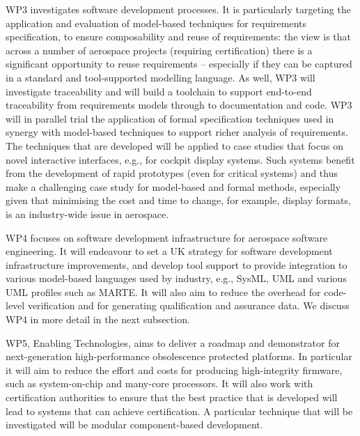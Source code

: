 WP3 investigates software development processes. It is particularly targeting the application and evaluation of model-based techniques for requirements
specification, to ensure composability and reuse of requirements: the view is that across a number of aerospace projects (requiring certification) there is a significant opportunity to reuse requirements -- especially if they can be captured in a standard and tool-supported modelling language. As well, WP3 will investigate traceability and will build a toolchain to support end-to-end
traceability from requirements models through to documentation and code. WP3 will in parallel trial the application of formal specification techniques used in
synergy with model-based techniques to support richer analysis of requirements. The techniques that are developed will be applied to case studies that
focus on novel interactive interfaces, e.g., for cockpit display systems. Such systems benefit from the development of rapid prototypes (even for critical
systems) and thus make a challenging case study for model-based and formal methods, especially given that minimising the cost and time to change,
for example, display formats, is an industry-wide issue in aerospace.

WP4 focuses on software development infrastructure for aerospace software engineering. It will endeavour to set a UK strategy for software development
infrastructure improvements, and  develop tool support to provide integration to various model-based languages used by industry, e.g., SysML, UML and
various UML profiles such as MARTE. It will also aim to reduce the overhead for code-level verification and for generating qualification and assurance data.
We discuss WP4 in more detail in the next subsection.

WP5, Enabling Technologies, aims to deliver a roadmap and demonstrator for next-generation high-performance obsolescence protected platforms. In particular
it will aim to reduce the effort and costs for producing high-integrity firmware, such as system-on-chip and many-core processors. It will also work with certification
authorities to ensure that the best practice that is developed will lead to systems that can achieve certification. A particular technique that will be investigated will
be modular component-based development.

